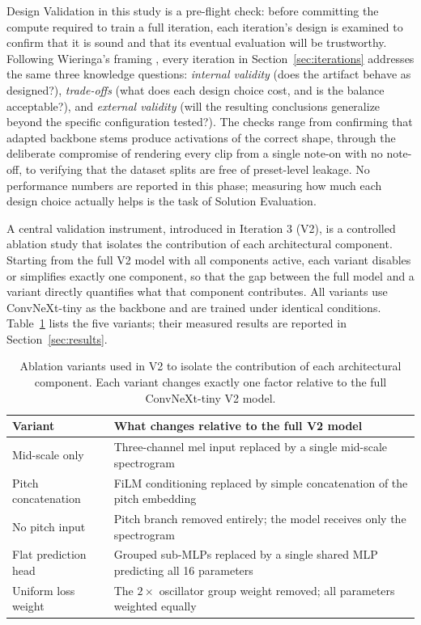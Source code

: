 Design Validation in this study is a pre-flight check: before committing the compute required to train a full iteration, each iteration's design is examined to confirm that it is sound and that its eventual evaluation will be trustworthy. Following Wieringa's framing \cite{wieringa2014design}, every iteration in Section~\ref{sec:iterations} addresses the same three knowledge questions: \textit{internal validity} (does the artifact behave as designed?), \textit{trade-offs} (what does each design choice cost, and is the balance acceptable?), and \textit{external validity} (will the resulting conclusions generalize beyond the specific configuration tested?). The checks range from confirming that adapted backbone stems produce activations of the correct shape, through the deliberate compromise of rendering every clip from a single note-on with no note-off, to verifying that the dataset splits are free of preset-level leakage. No performance numbers are reported in this phase; measuring how much each design choice actually helps is the task of Solution Evaluation.

\par \vspace{0.3cm}
\noindent A central validation instrument, introduced in Iteration 3 (V2), is a controlled ablation study that isolates the contribution of each architectural component. Starting from the full V2 model with all components active, each variant disables or simplifies exactly one component, so that the gap between the full model and a variant directly quantifies what that component contributes. All variants use ConvNeXt-tiny as the backbone and are trained under identical conditions. Table~\ref{tab:ablation_design} lists the five variants; their measured results are reported in Section~\ref{sec:results}.

\begin{table}[H]
\centering
\renewcommand{\arraystretch}{1.3}
\begin{tabular}{p{5.0cm} p{8.2cm}}
\hline
\textbf{Variant} & \textbf{What changes relative to the full V2 model} \\
\hline
Mid-scale only       & Three-channel mel input replaced by a single mid-scale spectrogram \\
Pitch concatenation  & FiLM conditioning replaced by simple concatenation of the pitch embedding \\
No pitch input       & Pitch branch removed entirely; the model receives only the spectrogram \\
Flat prediction head & Grouped sub-MLPs replaced by a single shared MLP predicting all 16 parameters \\
Uniform loss weight  & The $2\times$ oscillator group weight removed; all parameters weighted equally \\
\hline
\end{tabular}
\vspace{0.3cm}
\caption{Ablation variants used in V2 to isolate the contribution of each architectural component. Each variant changes exactly one factor relative to the full ConvNeXt-tiny V2 model.}
\label{tab:ablation_design}
\end{table}

